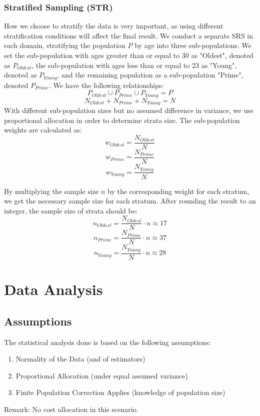 \documentclass[paper=a4, fontsize=12pt,twoside]{article}	%
\begin{document}
\vspace{2mm}
\subsubsection{Stratified Sampling (STR)}

\vspace{2mm}
How we choose to stratify the data is very important, as using different stratification conditions will affect the final result. We conduct a separate SRS in each domain, stratifying the population $P$ by age into three sub-populations. We set the sub-population with ages greater than or equal to 30 as "Oldest", denoted as $P_{Oldest}$, the sub-population with ages less than or equal to 23 as "Young", denoted as $P_{Young}$, and the remaining population as a sub-population "Prime", denoted $P_{Prime}$. We have the following relationships: 
$$P_{Oldest} \cup P_{Prime} \cup P_{Young} = P$$
$$N_{Oldest} + N_{Prime} + N_{Young} = N$$
With different sub-population sizes but no assumed difference in variance, we use proportional allocation in order to determine strata size. The sub-population weights are calculated as:
$$w_{Oldest}=\frac{N_{Oldest}}{N}$$
$$w_{Prime}=\frac{N_{Prime}}{N}$$
$$w_{Young}=\frac{N_{Young}}{N}$$

\vspace{2mm}
\noindent By multiplying the sample size $n$ by the corresponding weight for each stratum, we get the necessary sample size for each stratum. After rounding the result to an integer, the sample size of strata should be:
$$n_{Oldest}=\frac{N_{Oldest}}{N}\cdot n \approx 17$$
$$n_{Prime}=\frac{N_{Prime}}{N}\cdot n \approx 37$$
$$n_{Young}=\frac{N_{Young}}{N}\cdot n \approx 28$$



\section{Data Analysis}

\subsection{Assumptions}
The statistical analysis done is based on the following assumptions:
\begin{enumerate}
\item Normality of the Data (and of estimators)
\item Proportional Allocation (under equal assumed variance)
\item Finite Population Correction Applies (knowledge of population size)
\end{enumerate}
Remark: No cost allocation in this scenario.
\end{document}
